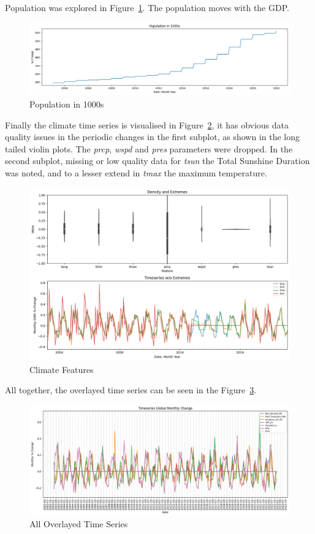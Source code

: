 \documentclass{ieeeaccess}
\begin{document}
Population was explored in Figure~\ref{fig:pop_timeseries}. The population moves with the GDP.
\begin{figure}[htb]
    \centering
    \includegraphics[width=\columnwidth]{data_analysis/population_timeseries.png}
    \caption{Population in 1000s}
    \label{fig:pop_timeseries}
\end{figure}

Finally the climate time series is visualised in Figure~\ref{fig:climate_timeseries}, it has obvious data quality issues in the periodic changes in the first subplot, as shown in the long tailed violin plots. The \textit{prcp}, \textit{wspd} and \textit{pres} parameters were dropped.
In the second subplot, missing or low quality data for \textit{tsun} the Total Sunshine Duration was noted, and to a lesser extend in \textit{tmax} the maximum temperature.
\begin{figure}[htb]
    \centering
    \includegraphics[width=\columnwidth]{data_analysis/climate_timeseries.png}
    \caption{Climate Features}
    \label{fig:climate_timeseries}
\end{figure}

All together, the overlayed time series can be seen in the Figure~\ref{fig:all_timeseries}.
\begin{figure}[htb]
    \centering
    \includegraphics[width=\columnwidth]{data_analysis/all_timeseries.png}
    \caption{All Overlayed Time Series}
    \label{fig:all_timeseries}
\end{figure}
\end{document}
